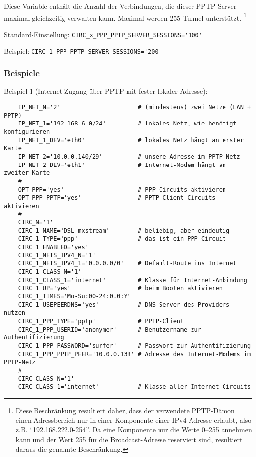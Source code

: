 \begin{description}

Diese Variable enthält die Anzahl der Verbindungen, die dieser PPTP-Server
maximal gleichzeitig verwalten kann. Maximal werden 255 Tunnel unterstützt.
\footnote{Diese Beschränkung resultiert daher, dass der verwendete PPTP-Dämon
einen Adressbereich nur in einer Komponente einer IPv4-Adresse erlaubt, also
z.B. ``192.168.222.0-254''. Da eine Komponente nur die Werte 0--255 annehmen
kann und der Wert 255 für die Broadcast-Adresse reserviert sind, resultiert
daraus die genannte Beschränkung.}

Standard-Einstellung: \verb+CIRC_x_PPP_PPTP_SERVER_SESSIONS='100'+

Beispiel: \verb+CIRC_1_PPP_PPTP_SERVER_SESSIONS='200'+

\end{description}

\subsubsection{Beispiele}

\noindent
Beispiel 1 (Internet-Zugang über PPTP mit fester lokaler Adresse):

\begin{example}
\begin{verbatim}
    IP_NET_N='2'                      # (mindestens) zwei Netze (LAN + PPTP)
    IP_NET_1='192.168.6.0/24'         # lokales Netz, wie benötigt konfigurieren
    IP_NET_1_DEV='eth0'               # lokales Netz hängt an erster Karte
    IP_NET_2='10.0.0.140/29'          # unsere Adresse im PPTP-Netz
    IP_NET_2_DEV='eth1'               # Internet-Modem hängt an zweiter Karte
    #
    OPT_PPP='yes'                     # PPP-Circuits aktivieren
    OPT_PPP_PPTP='yes'                # PPTP-Client-Circuits aktivieren
    #
    CIRC_N='1'
    CIRC_1_NAME='DSL-mxstream'        # beliebig, aber eindeutig
    CIRC_1_TYPE='ppp'                 # das ist ein PPP-Circuit
    CIRC_1_ENABLED='yes'
    CIRC_1_NETS_IPV4_N='1'
    CIRC_1_NETS_IPV4_1='0.0.0.0/0'    # Default-Route ins Internet
    CIRC_1_CLASS_N='1'
    CIRC_1_CLASS_1='internet'         # Klasse für Internet-Anbindung
    CIRC_1_UP='yes'                   # beim Booten aktivieren
    CIRC_1_TIMES='Mo-Su:00-24:0.0:Y'
    CIRC_1_USEPEERDNS='yes'           # DNS-Server des Providers nutzen
    CIRC_1_PPP_TYPE='pptp'            # PPTP-Client
    CIRC_1_PPP_USERID='anonymer'      # Benutzername zur Authentifizierung
    CIRC_1_PPP_PASSWORD='surfer'      # Passwort zur Authentifizierung
    CIRC_1_PPP_PPTP_PEER='10.0.0.138' # Adresse des Internet-Modems im PPTP-Netz
    #
    CIRC_CLASS_N='1'
    CIRC_CLASS_1='internet'           # Klasse aller Internet-Circuits
\end{verbatim}
\end{example}

